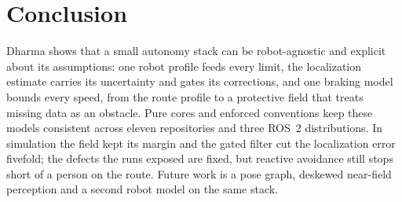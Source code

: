 \section{Conclusion}
\label{sec:conclusion}

Dharma shows that a small autonomy stack can be robot-agnostic and explicit about its
assumptions: one robot profile feeds every limit, the localization estimate carries its
uncertainty and gates its corrections, and one braking model bounds every speed, from the route
profile to a protective field that treats missing data as an obstacle. Pure cores and enforced
conventions keep these models consistent across eleven repositories and three ROS~2
distributions. In simulation the field kept its margin and the gated filter cut the
localization error fivefold; the defects the runs exposed are fixed, but reactive avoidance
still stops short of a person on the route. Future work is a pose graph, deskewed near-field
perception and a second robot model on the same stack.

